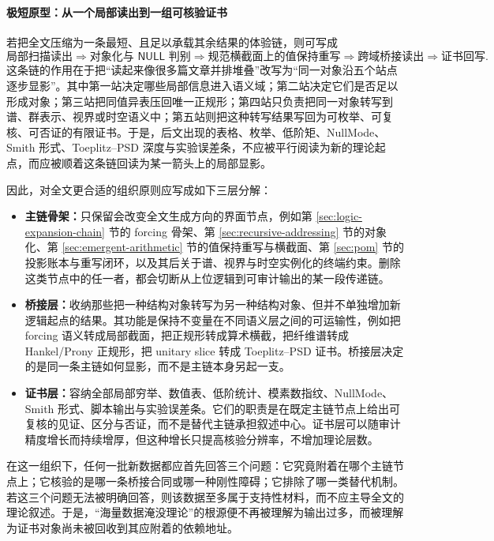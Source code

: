\paragraph{极短原型：从一个局部读出到一组可核验证书}
若把全文压缩为一条最短、且足以承载其余结果的体验链，则可写成
\[
\text{局部扫描读出}
\Longrightarrow
\text{对象化与 \(\mathsf{NULL}\) 判别}
\Longrightarrow
\text{规范横截面上的值保持重写}
\Longrightarrow
\text{跨域桥接读出}
\Longrightarrow
\text{证书回写}.
\]
这条链的作用在于把“读起来像很多篇文章并排堆叠”改写为“同一对象沿五个站点逐步显影”。其中第一站决定哪些局部信息进入语义域；第二站决定它们是否足以形成对象；第三站把同值异表压回唯一正规形；第四站只负责把同一对象转写到谱、群表示、视界或时空语义中；第五站则把这种转写结果写回为可枚举、可复核、可否证的有限证书。于是，后文出现的表格、枚举、低阶矩、NullMode、Smith 形式、Toeplitz--PSD 深度与实验误差条，不应被平行阅读为新的理论起点，而应被顺着这条链回读为某一箭头上的局部显影。
\par
因此，对全文更合适的组织原则应写成如下三层分解：
\begin{itemize}
  \item \textbf{主链骨架：}只保留会改变全文生成方向的界面节点，例如第 \ref{sec:logic-expansion-chain} 节的 forcing 骨架、第 \ref{sec:recursive-addressing} 节的对象化、第 \ref{sec:emergent-arithmetic} 节的值保持重写与横截面、第 \ref{sec:pom} 节的投影账本与重写闭环，以及其后关于谱、视界与时空实例化的终端约束。删除这类节点中的任一者，都会切断从上位逻辑到可审计输出的某一段传递链。
  \item \textbf{桥接层：}收纳那些把一种结构对象转写为另一种结构对象、但并不单独增加新逻辑起点的结果。其功能是保持不变量在不同语义层之间的可运输性，例如把 forcing 语义转成局部截面，把正规形转成算术横截，把纤维谱转成 Hankel/Prony 正规形，把 unitary slice 转成 Toeplitz--PSD 证书。桥接层决定的是同一条主链如何显影，而不是主链本身另起一支。
  \item \textbf{证书层：}容纳全部局部穷举、数值表、低阶统计、模素数指纹、NullMode、Smith 形式、脚本输出与实验误差条。它们的职责是在既定主链节点上给出可复核的见证、区分与否证，而不是替代主链承担叙述中心。证书层可以随审计精度增长而持续增厚，但这种增长只提高核验分辨率，不增加理论层数。
\end{itemize}
\par
在这一组织下，任何一批新数据都应首先回答三个问题：它究竟附着在哪个主链节点上；它核验的是哪一条桥接合同或哪一种刚性障碍；它排除了哪一类替代机制。若这三个问题无法被明确回答，则该数据至多属于支持性材料，而不应主导全文的理论叙述。于是，“海量数据淹没理论”的根源便不再被理解为输出过多，而被理解为证书对象尚未被回收到其应附着的依赖地址。
